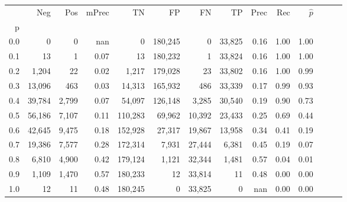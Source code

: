 \begin{tabular}{rrrrrrrrrrrrrr}
\toprule
{} &     Neg &    Pos & mPrec &       TN &       FP &      FN &      TP &  Prec &   Rec & $\hat{p}$ \\
p   &         &        &       &          &          &         &         &       &       &           \\
\midrule
0.0 &       0 &      0 &   nan &        0 &  180,245 &       0 &  33,825 &  0.16 &  1.00 &      1.00 \\
0.1 &      13 &      1 &  0.07 &       13 &  180,232 &       1 &  33,824 &  0.16 &  1.00 &      1.00 \\
0.2 &   1,204 &     22 &  0.02 &    1,217 &  179,028 &      23 &  33,802 &  0.16 &  1.00 &      0.99 \\
0.3 &  13,096 &    463 &  0.03 &   14,313 &  165,932 &     486 &  33,339 &  0.17 &  0.99 &      0.93 \\
0.4 &  39,784 &  2,799 &  0.07 &   54,097 &  126,148 &   3,285 &  30,540 &  0.19 &  0.90 &      0.73 \\
0.5 &  56,186 &  7,107 &  0.11 &  110,283 &   69,962 &  10,392 &  23,433 &  0.25 &  0.69 &      0.44 \\
0.6 &  42,645 &  9,475 &  0.18 &  152,928 &   27,317 &  19,867 &  13,958 &  0.34 &  0.41 &      0.19 \\
0.7 &  19,386 &  7,577 &  0.28 &  172,314 &    7,931 &  27,444 &   6,381 &  0.45 &  0.19 &      0.07 \\
0.8 &   6,810 &  4,900 &  0.42 &  179,124 &    1,121 &  32,344 &   1,481 &  0.57 &  0.04 &      0.01 \\
0.9 &   1,109 &  1,470 &  0.57 &  180,233 &       12 &  33,814 &      11 &  0.48 &  0.00 &      0.00 \\
1.0 &      12 &     11 &  0.48 &  180,245 &        0 &  33,825 &       0 &   nan &  0.00 &      0.00 \\
\bottomrule
\end{tabular}
